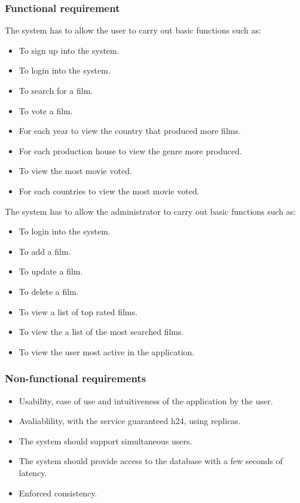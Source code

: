 \documentclass[a4paper, oneside]{article}
\begin{document}
\subsubsection{Functional requirement}
The system has to allow the user to carry out basic functions such as:
\begin{itemize}
\item To sign up into the system.
\item To login into the system.
\item To search for a film.
\item To vote a film.
\item For each year to view the country that produced more films.
\item For each production house to view the genre more produced.
\item To view the most movie voted.
\item For each countries to view the most movie voted.
\end{itemize}
\vspace{2mm}
The system has to allow the administrator to carry out basic functions such as:
\begin{itemize}
\item To login into the system.
\item To add a film.
\item To update a film.
\item To delete a film.
\item To view a list of top rated films.
\item To view the a list of the most searched films.
\item To view the user most active in the application.
\end{itemize}
\vspace{2mm}

\subsubsection{Non-functional requirements}
\begin{itemize}
\item Usability, ease of use and intuitiveness of the application by the user.
\item Avaliablility, with the service guaranteed h24, using replicas.
\item The system should support simultaneous users.
\item The system should provide access to the database with a few seconds of latency.
\item Enforced consistency.
\end{itemize}
\end{document}
